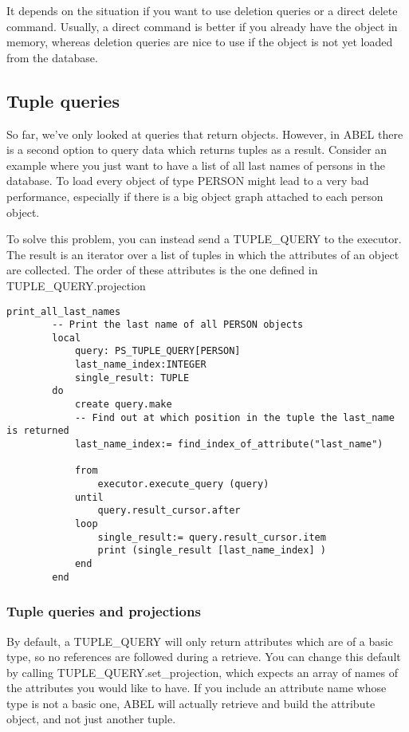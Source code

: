 It depends on the situation if you want to use deletion queries or a direct delete command. 
Usually, a direct command is better if you already have the object in memory, whereas deletion queries are nice to use if the object is not yet loaded from the database.

\subsection{Tuple queries}

So far, we've only looked at queries that return objects. However, in ABEL there is a second option to query data which returns tuples as a result.
Consider an example where you just want to have a list of all last names of persons in the database. 
To load every object of type PERSON might lead to a very bad performance, especially if there is a big object graph attached to each person object.

To solve this problem, you can instead send a TUPLE\_QUERY to the executor. 
The result is an iterator over a list of tuples in which the attributes of an object are collected. The order of these attributes is the one defined in TUPLE\_QUERY.projection

\begin{lstlisting}[language=OOSC2Eiffel, captionpos=b, caption={}, label={lst:tuple_query_simple}]
	print_all_last_names
		-- Print the last name of all PERSON objects
		local
			query: PS_TUPLE_QUERY[PERSON]
			last_name_index:INTEGER
			single_result: TUPLE
		do
			create query.make
			-- Find out at which position in the tuple the last_name is returned
			last_name_index:= find_index_of_attribute("last_name")

			from
				executor.execute_query (query)
			until
				query.result_cursor.after
			loop
				single_result:= query.result_cursor.item
				print (single_result [last_name_index] )
			end			
		end
\end{lstlisting}

\subsubsection{Tuple queries and projections}
By default, a TUPLE\_QUERY will only return attributes which are of a basic type, so no references are followed during a retrieve.
You can change this default by calling TUPLE\_QUERY.set\_projection, which expects an array of names of the attributes you would like to have.
If you include an attribute name whose type is not a basic one, ABEL will actually retrieve and build the attribute object, and not just another tuple.


